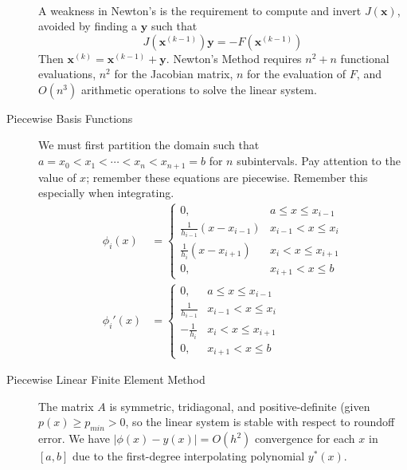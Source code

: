 \documentclass[8pt]{article}
\begin{document}
\begin{multicols}{2}
\begin{description}
\begin{align*}
    \end{align*}
    A weakness in Newton's is the requirement to compute and invert $J(\mathbf{x})$,
    avoided by finding a $\mathbf{y}$ such that
    $$J(\mathbf{x}^{(k-1)})\mathbf{y}=-F(\mathbf{x}^{(k-1)})$$
    Then $\mathbf{x}^{(k)}=\mathbf{x}^{(k-1)}+\mathbf{y}$. Newton's
    Method requires $n^2+n$ functional evaluations, $n^2$ for the
    Jacobian matrix, $n$ for the evaluation of $F$, and
    $O(n^3)$ arithmetic operations to solve the linear system.
  \item[Piecewise Basis Functions]
    We must first partition the domain such that
    $a=x_0<x_1<\cdots<x_n<x_{n+1}=b$ for $n$ subintervals. Pay
    attention to the value of $x$; remember these equations are
    piecewise. Remember this especially when integrating.
    \begin{equation*}
      \begin{aligned}
        \phi_i(x) &= \left\{
          \begin{array}{cc}
            0, & a\leq x\leq x_{i-1} \\
            \frac{1}{h_{i-1}}(x-x_{i-1}) & x_{i-1}< x\leq x_i \\
            \frac{1}{h_{i}}(x-x_{i+1}) & x_{i}< x\leq x_{i+1} \\
            0, & x_{i+1}< x\leq b
          \end{array}
        \right. \\
        \phi_i'(x) &= \left\{
          \begin{array}{cc}
            0, & a\leq x\leq x_{i-1} \\
            \frac{1}{h_{i-1}} & x_{i-1}< x\leq x_i \\
            -\frac{1}{h_{i}} & x_{i}< x\leq x_{i+1} \\
            0, & x_{i+1}< x\leq b
          \end{array}
        \right.
      \end{aligned}
    \end{equation*}
  \item[Piecewise Linear Finite Element Method] The matrix $A$ is
    symmetric, tridiagonal, and positive-definite (given $p(x)\geq
    p_{min}>0$, so the linear system is stable with respect to
    roundoff error. We have $|\phi(x)-y(x)|=O(h^2)$ convergence for
    each $x$ in $[a,b]$ due to the first-degree interpolating
    polynomial $y^*(x)$.


\end{description}
\end{multicols}
\end{document}
